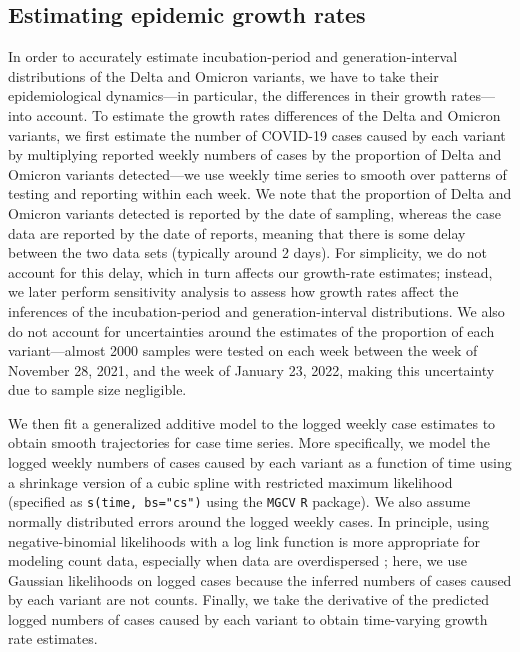 \documentclass[12pt]{article}
\begin{document}
\subsection{Estimating epidemic growth rates}

In order to accurately estimate incubation-period and generation-interval distributions of the Delta and Omicron variants, we have to take their epidemiological dynamics---in particular, the differences in their growth rates---into account.
To estimate the growth rates differences of the Delta and Omicron variants, we first estimate the number of COVID-19 cases caused by each variant by multiplying reported weekly numbers of cases by the proportion of Delta and Omicron variants detected---we use weekly time series to smooth over patterns of testing and reporting within each week. 
We note that the proportion of Delta and Omicron variants detected is reported by the date of sampling, whereas the case data are reported by the date of reports, meaning that there is some delay between the two data sets (typically around 2 days).
For simplicity, we do not account for this delay, which in turn affects our growth-rate estimates; 
instead, we later perform sensitivity analysis to assess how growth rates affect the inferences of the incubation-period and generation-interval distributions.
We also do not account for uncertainties around the estimates of the proportion of each variant---almost 2000 samples were tested on each week between the week of November 28, 2021, and the week of January 23, 2022, making this uncertainty due to sample size negligible.

We then fit a generalized additive model \citep{wood2001mgcv} to the logged weekly case estimates to obtain smooth trajectories for case time series.
More specifically, we model the logged weekly numbers of cases caused by each variant as a function of time using a shrinkage version of a cubic spline with restricted maximum likelihood (specified as \texttt{s(time, bs="cs")} using the \texttt{MGCV} \texttt{R} package). 
We also assume normally distributed errors around the logged weekly cases.
In principle, using negative-binomial likelihoods with a log link function is more appropriate for modeling count data, especially when data are overdispersed \citep{ver2007quasi};
here, we use Gaussian likelihoods on logged cases because the inferred numbers of cases caused by each variant are not counts.
Finally, we take the derivative of the predicted logged numbers of cases caused by each variant to obtain time-varying growth rate estimates.
\end{document}
